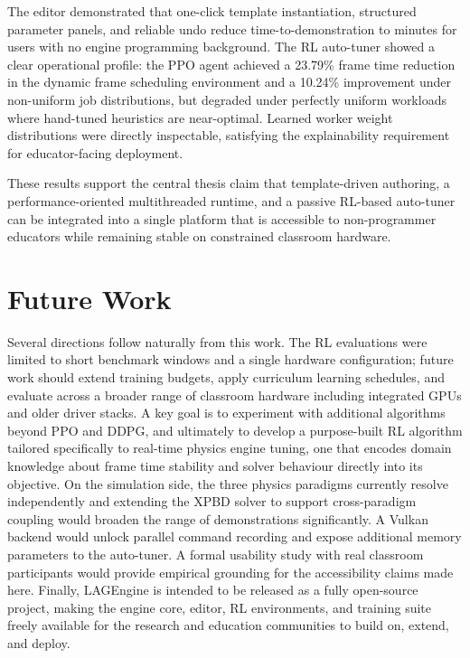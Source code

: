 \documentclass[9pt,openany]{extbook}
\begin{document}
The editor demonstrated that one-click template instantiation, structured
parameter panels, and reliable undo reduce time-to-demonstration to minutes
for users with no engine programming background.  The RL auto-tuner showed
a clear operational profile: the PPO agent achieved a 23.79\% frame time
reduction in the dynamic frame scheduling environment and a 10.24\%
improvement under non-uniform job distributions, but degraded under
perfectly uniform workloads where hand-tuned heuristics are near-optimal.
Learned worker weight distributions were directly inspectable, satisfying
the explainability requirement for educator-facing deployment.

These results support the central thesis claim that template-driven
authoring, a performance-oriented multithreaded runtime, and a passive
RL-based auto-tuner can be integrated into a single platform that is
accessible to non-programmer educators while remaining stable on constrained
classroom hardware.

\section{Future Work}

Several directions follow naturally from this work. The RL evaluations were
limited to short benchmark windows and a single hardware configuration;
future work should extend training budgets, apply curriculum learning
schedules, and evaluate across a broader range of classroom hardware
including integrated GPUs and older driver stacks. A key goal is to
experiment with additional algorithms beyond PPO and DDPG, and ultimately
to develop a purpose-built RL algorithm tailored specifically to real-time
physics engine tuning, one that encodes domain knowledge about frame
time stability and solver behaviour directly into its objective. On the
simulation side, the three physics paradigms currently resolve
independently and extending the XPBD solver to support cross-paradigm
coupling would broaden the range of demonstrations significantly. A
Vulkan backend would unlock parallel command recording and expose
additional memory parameters to the auto-tuner. A formal usability study
with real classroom participants would provide empirical grounding for the
accessibility claims made here. Finally, LAGEngine is intended to be
released as a fully open-source project, making the engine core, editor,
RL environments, and training suite freely available for the research and
education communities to build on, extend, and deploy.
\end{document}
